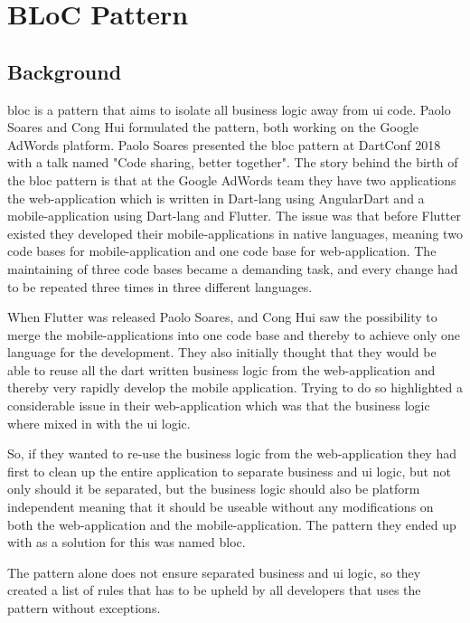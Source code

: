 \section{BLoC Pattern}

\subsection{Background}
\gls{bloc} is a pattern that aims to isolate all business logic away from \gls{ui} code. Paolo Soares and Cong Hui formulated the pattern, both working on the Google AdWords platform. Paolo Soares presented the \gls{bloc} pattern at DartConf 2018 with a talk named "Code sharing, better together". The story behind the birth of the \gls{bloc} pattern is that at the Google AdWords team they have two applications the web-application which is written in Dart-lang using AngularDart and a mobile-application using Dart-lang and Flutter. The issue was that before Flutter existed they developed their mobile-applications in native languages, meaning two code bases for mobile-application and one code base for web-application. The maintaining of three code bases became a demanding task, and every change had to be repeated three times in three different languages.

When Flutter was released Paolo Soares, and Cong Hui saw the possibility to merge the mobile-applications into one code base and thereby to achieve only one language for the development. They also initially thought that they would be able to reuse all the dart written business logic from the web-application and thereby very rapidly develop the mobile application. Trying to do so highlighted a considerable issue in their web-application which was that the business logic where mixed in with the \gls{ui} logic.

So, if they wanted to re-use the business logic from the web-application they had first to clean up the entire application to separate business and \gls{ui} logic, but not only should it be separated, but the business logic should also be platform independent meaning that it should be useable without any modifications on both the web-application and the mobile-application. The pattern they ended up with as a solution for this was named \gls{bloc}.

The pattern alone does not ensure separated business and \gls{ui} logic, so they created a list of rules that has to be upheld by all developers that uses the pattern without exceptions.

